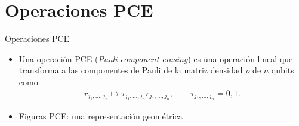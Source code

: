 \documentclass[xcolor=dvipsnames,presentation]{beamer}%
\begin{document}

\section{Operaciones PCE}

\begin{frame}{Operaciones PCE}
	\begin{itemize}
		\item<1-> Una operación PCE (\textit{Pauli component erasing}) 
		es una operación lineal que transforma a las 	componentes 
		de Pauli de la matriz densidad $\rho$ de $n$ qubits como
		\begin{align*}
		r_{j_1,\ldots,j_n}\longmapsto \tau_{j_1,\ldots,j_n}r_{j_1,\ldots,j_n},
		\qquad \tau_{j_1,\ldots,j_n}=0,1.
		\end{align*} 
	
		\item<2-> \vfill Figuras PCE: una representación geométrica
		 

\end{itemize}
\end{frame}
\end{document}
